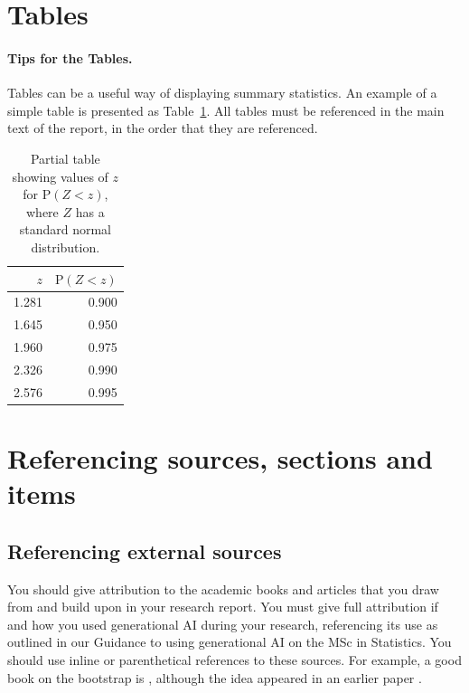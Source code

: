 \section{Tables}\label{sec:tablesection}

\paragraph{Tips for the Tables.} Tables can be a useful way of displaying summary statistics. An example of a simple table is presented as Table~\ref{tab:normal}. All tables must be referenced in the main text of the report, in the order that they are referenced.

\begin{table}[ht]
\centering
\begin{tabular}{rr}
  \hline
    $z$& $\textrm{P}(Z < z)$ \\
  \hline
    1.281& 0.900\\
    1.645& 0.950\\
    1.960& 0.975\\
    2.326& 0.990 \\
    2.576& 0.995 \\
   \hline
\end{tabular}
    \caption{Partial table showing values of $z$ for $\textrm{P}(Z < z)$, 
    where $Z$ has a standard normal distribution.}
    \label{tab:normal}
\end{table}



\section{Referencing sources, sections and items} \label{sec:referencing}

\subsection{Referencing external sources}

You should give attribution to the academic books and articles that you draw from and build upon in your research report. You must give full attribution if and how you used generational AI during your research, referencing its use as outlined in our Guidance to using generational AI on the MSc in Statistics. You should use inline or parenthetical references to these sources. For example, a good book on the bootstrap is \cite{efrontib}, although the idea appeared in an earlier paper \citep{efron1979}.

